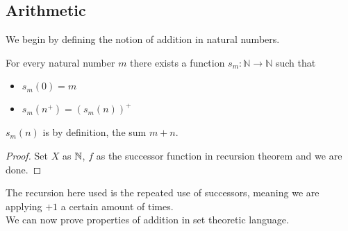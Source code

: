 \documentclass[a4paper]{article}
\begin{document}
\subsection{Arithmetic}
We begin by defining the notion of addition in natural numbers. 
\begin{prp}{}{} For every natural number $m$ there exists a function $s_m:\mathbb{N}\to\mathbb{N}$ such that
\begin{itemize}
\item $s_m(0)=m$
\item $s_m(n^+)=(s_m(n))^+$
\end{itemize}
$s_m(n)$ is by definition, the sum $m+n$. 
\begin{proof}
Set $X$ as $\mathbb{N}$, $f$ as the successor function in recursion theorem and we are done. 
\end{proof}
\end{prp}

The recursion here used is the repeated use of successors, meaning we are applying $+1$ a certain amount of times. \\
We can now prove properties of addition in set theoretic language. 
\end{document}

